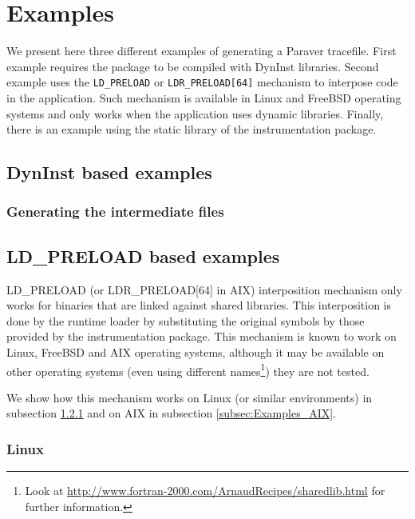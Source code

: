 \chapter{Examples}\label{cha:Examples}

We present here three different examples of generating a Paraver tracefile. First example requires the package to be compiled with DynInst libraries. Second example uses the {\tt LD\_PRELOAD} or {\tt LDR\_PRELOAD[64]} mechanism to interpose code in the application. Such mechanism is available in Linux and FreeBSD operating systems and only works when the application uses dynamic libraries. Finally, there is an example using the static library of the instrumentation package.

\section{DynInst based examples}\label{sec:Examples_DynInst}

\subsection{Generating the intermediate files}\label{subsec:Examples_DynInst_Intermediate}

\section{LD\_PRELOAD based examples}\label{sec:Examples_LDPRELOAD}

LD\_PRELOAD (or LDR\_PRELOAD[64] in AIX) interposition mechanism only works for binaries that are linked against shared libraries. This interposition is done by the runtime loader by substituting the original symbols by those provided by the instrumentation package. This mechanism is known to work on Linux, FreeBSD and AIX operating systems, although it may be available on other operating systems (even using different names\footnote{Look at \url{http://www.fortran-2000.com/ArnaudRecipes/sharedlib.html} for further information.}) they are not tested.

We show how this mechanism works on Linux (or similar environments) in subsection \ref{subsec:Examples_Linux} and on AIX in subsection \ref{subsec:Examples_AIX}.

\subsection{Linux}\label{subsec:Examples_Linux}

